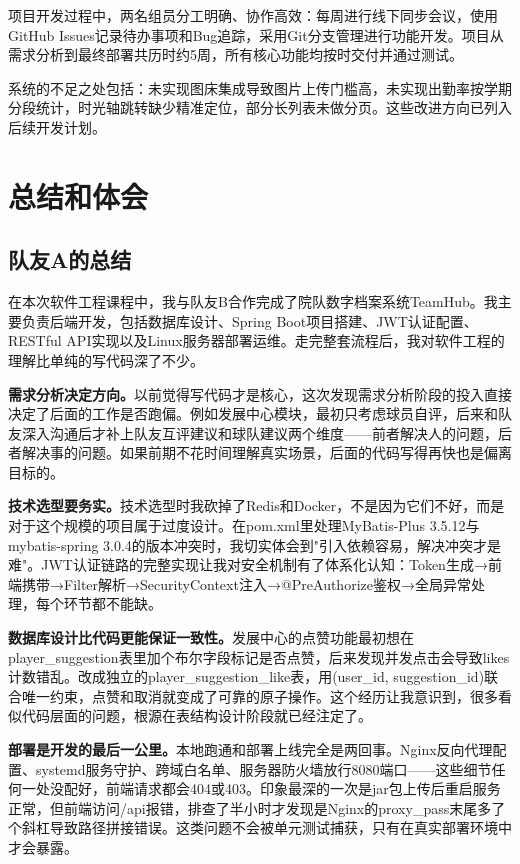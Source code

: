 \documentclass[12pt,a4paper]{ctexart}
\begin{document}
项目开发过程中，两名组员分工明确、协作高效：每周进行线下同步会议，使用GitHub Issues记录待办事项和Bug追踪，采用Git分支管理进行功能开发。项目从需求分析到最终部署共历时约5周，所有核心功能均按时交付并通过测试。

系统的不足之处包括：未实现图床集成导致图片上传门槛高，未实现出勤率按学期分段统计，时光轴跳转缺少精准定位，部分长列表未做分页。这些改进方向已列入后续开发计划。



\newpage
\section{总结和体会}

\subsection{队友A的总结}

在本次软件工程课程中，我与队友B合作完成了院队数字档案系统TeamHub。我主要负责后端开发，包括数据库设计、Spring Boot项目搭建、JWT认证配置、RESTful API实现以及Linux服务器部署运维。走完整套流程后，我对软件工程的理解比单纯的写代码深了不少。

\textbf{需求分析决定方向。}以前觉得写代码才是核心，这次发现需求分析阶段的投入直接决定了后面的工作是否跑偏。例如发展中心模块，最初只考虑球员自评，后来和队友深入沟通后才补上队友互评建议和球队建议两个维度——前者解决人的问题，后者解决事的问题。如果前期不花时间理解真实场景，后面的代码写得再快也是偏离目标的。

\textbf{技术选型要务实。}技术选型时我砍掉了Redis和Docker，不是因为它们不好，而是对于这个规模的项目属于过度设计。在pom.xml里处理MyBatis-Plus 3.5.12与mybatis-spring 3.0.4的版本冲突时，我切实体会到"引入依赖容易，解决冲突才是难"。JWT认证链路的完整实现让我对安全机制有了体系化认知：Token生成→前端携带→Filter解析→SecurityContext注入→@PreAuthorize鉴权→全局异常处理，每个环节都不能缺。

\textbf{数据库设计比代码更能保证一致性。}发展中心的点赞功能最初想在player\_suggestion表里加个布尔字段标记是否点赞，后来发现并发点击会导致likes计数错乱。改成独立的player\_suggestion\_like表，用(user\_id, suggestion\_id)联合唯一约束，点赞和取消就变成了可靠的原子操作。这个经历让我意识到，很多看似代码层面的问题，根源在表结构设计阶段就已经注定了。

\textbf{部署是开发的最后一公里。}本地跑通和部署上线完全是两回事。Nginx反向代理配置、systemd服务守护、跨域白名单、服务器防火墙放行8080端口——这些细节任何一处没配好，前端请求都会404或403。印象最深的一次是jar包上传后重启服务正常，但前端访问/api报错，排查了半小时才发现是Nginx的proxy\_pass末尾多了个斜杠导致路径拼接错误。这类问题不会被单元测试捕获，只有在真实部署环境中才会暴露。
\end{document}
